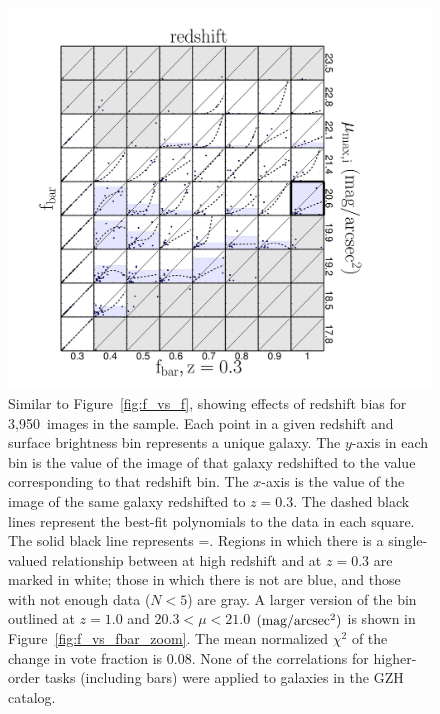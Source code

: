 \documentclass[twocolumn]{aastex6}
\begin{document}
\begin{figure}
\centering
\includegraphics[width=\textwidth]{figures/p_vs_p_SB_redshift_bar.pdf}
\caption{Similar to Figure~\ref{fig:f_vs_f}, showing effects of redshift bias
for 3,950~images in the \ferengi{} sample. Each point in a given redshift
and surface brightness bin represents a unique galaxy. The $y$-axis in each
bin is the \ffeatures{} value of the image of that galaxy redshifted to the
value corresponding to that redshift bin. The $x$-axis is the \ffeatures{}
value of the image of the same galaxy redshifted to $z=0.3$. The dashed
black lines represent the best-fit polynomials to the data in each square.
The solid black line represents \ffeaturesz=\ffeaturesrest. Regions in
which there is a single-valued relationship between \ffeatures{} at high
redshift and at $z=0.3$ are marked in white; those in which there is not
are blue, and those with not enough data ($N<5$) are gray. A larger version of the bin outlined at $z=1.0$ and $20.3 < \mu < 21.0$ $\rm (mag/arcsec^2)$ is shown in Figure~\ref{fig:f_vs_fbar_zoom}. The mean
normalized $\chi^2$ of the change in vote fraction is 0.08. None of the
correlations for higher-order tasks (including bars) were applied to
galaxies in the GZH catalog.}
\label{fig:f_vs_fbar}
\end{figure}
\end{document}
